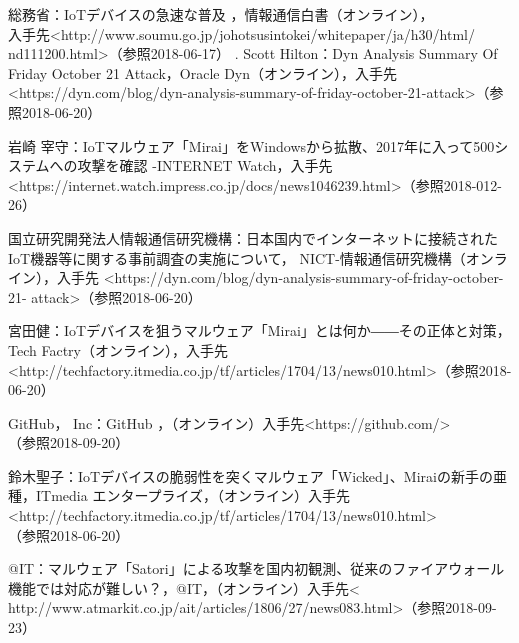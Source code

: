 
\begin{thebibliography}{30}
		総務省：IoTデバイスの急速な普及 ，情報通信白書（オンライン），\\入手先\textless http://www.soumu.go.jp/johotsusintokei/whitepaper/ja/h30/html/ \\nd111200.html\textgreater（参照2018-06-17）
   .
       Scott Hilton：Dyn Analysis Summary Of Friday October 21 Attack，Oracle Dyn（オンライン），入手先\textless https:\slash\slash{}dyn.com\slash{}blog\slash{}dyn-analysis-summary-of-friday-october-21-attack\textgreater （参照2018-06-20）
    
       岩崎 宰守：IoTマルウェア「Mirai」をWindowsから拡散、2017年に入って500システムへの攻撃を確認 -INTERNET Watch，入手先\textless https:\slash\slash{}internet.watch.impress.co.jp\slash{}docs\slash{}news1046239.html\textgreater（参照2018-012-26）
    
        国立研究開発法人情報通信研究機構：日本国内でインターネットに接続されたIoT機器等に関する事前調査の実施について， NICT-情報通信研究機構（オンライン），入手先 \textless https:\slash\slash{}dyn.com\slash{}blog\slash{}dyn-analysis-summary-of-friday-october-21-
        attack\textgreater （参照2018-06-20）
        
        宮田健：IoTデバイスを狙うマルウェア「Mirai」とは何か――その正体と対策，Tech Factry（オンライン），入手先\textless http:\slash\slash{}techfactory.itmedia.co.jp\slash{}tf\slash{}articles\slash{}1704\slash{}13\slash{}news010.html\textgreater（参照2018-06-20）
        
        GitHub， Inc：GitHub ，（オンライン）入手先\textless https:\slash\slash{}github.com\slash{}\textgreater\\（参照2018-09-20）
        
        鈴木聖子：IoTデバイスの脆弱性を突くマルウェア「Wicked」、Miraiの新手の亜種，ITmedia エンタープライズ，（オンライン）入手先\textless http:\slash\slash{}techfactory.itmedia.co.jp\slash{}tf\slash{}articles\slash{}1704\slash{}13\slash{}news010.html\textgreater\\（参照2018-06-20）
    
        @IT：マルウェア「Satori」による攻撃を国内初観測、従来のファイアウォール機能では対応が難しい？，@IT，（オンライン）入手先\textless 
        http:\slash\slash{}www.atmarkit.co.jp\slash{}ait\slash{}articles\slash{}1806\slash{}27\slash{}news083.html\textgreater （参照2018-09-23）


\end{thebibliography}
